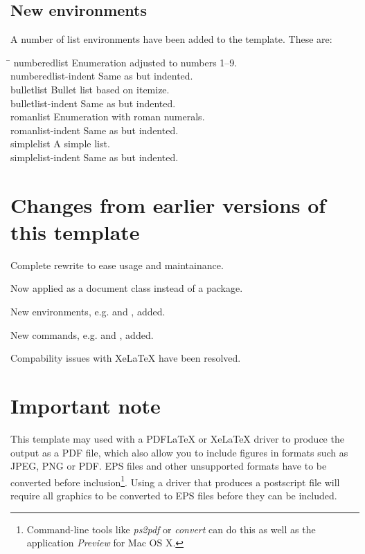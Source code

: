 \subsection{New environments}
A number of list environments have been added to the template. These are:
\begin{tabbing}
\hspace{4cm}\=\kill
numberedlist \> Enumeration adjusted to numbers 1--9.\\
numberedlist-indent \> Same as  but indented.\\
bulletlist \> Bullet list based on itemize.\\
bulletlist-indent \> Same as  but indented.\\
romanlist \> Enumeration with roman numerals.\\
romanlist-indent \> Same as  but indented.\\
simplelist \> A simple list.\\
simplelist-indent \> Same as  but indented.
\end{tabbing}

\section{Changes from earlier versions of this template}
\begin{bulletlist} 
\item Complete rewrite to ease usage and maintainance.
\item Now applied as a document class instead of a package.
\item New environments, e.g.  and , added.
\item New commands, e.g.  and , added.
\item Compability issues with XeLaTeX have been resolved.
\end{bulletlist} 

\section{Important note}
This template may used with a PDFLaTeX or XeLaTeX driver to produce the output as a PDF file, which also allow you to include figures in formats such as JPEG, PNG or PDF. EPS files and other unsupported formats have to be converted before inclusion\footnote{Command-line tools like \emph{ps2pdf} or \emph{convert} can do this as well as the application \emph{Preview} for Mac OS X.}. Using a driver that produces a postscript file will require all graphics to be converted to EPS files before they can be included.   

